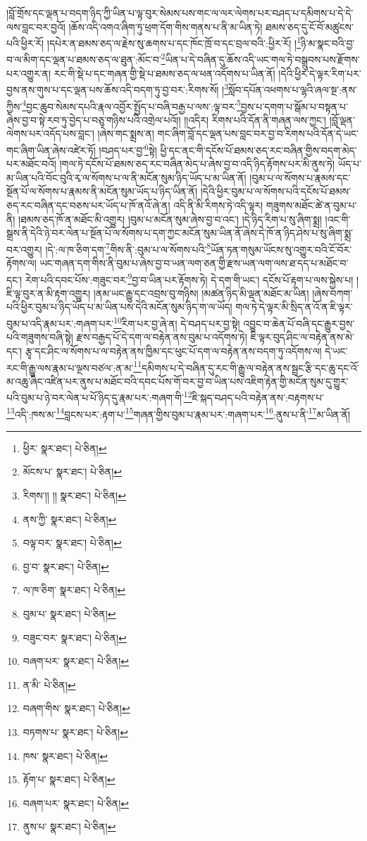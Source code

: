 །བློ་གྲོས་དང་ལྡན་པ་བདག་ཉིད་ཀྱི་ཡིན་པ་ལྟ་བུར་སེམས་པས་གང་ལ་ལར་ལེགས་པར་བཤད་པ་དམིགས་པ་དེ་དེ་ལས་བླང་བར་བྱའོ། །ཆོས་འདི་འགའ་ཞིག་ཏུ་ཕྲག་དོག་གིས་གནས་པ་ནི་མ་ཡིན་ཏེ། ཐམས་ཅད་དུ་ངོ་བོ་མཚུངས་པའི་ཕྱིར་རོ། །དཔེར་ན་ཐམས་ཅད་ལ་རྗེས་སུ་ཆགས་པ་དང་ཁོང་ཁྲོ་བ་དང་བྲལ་བའི་:ཕྱིར་རོ། །\footnote{ཕྱིར་  སྣར་ཐང་།  པེ་ཅིན། }ཉི་མ་སྣང་བའི་བྱ་བ་ལ་མིག་དང་ལྡན་པ་ཐམས་ཅད་ལ་ཐུན་:མོང་བ་\footnote{མོངས་པ་  སྣར་ཐང་།  པེ་ཅིན། }ཡིན་པ་དེ་བཞིན་དུ་ཆོས་འདི་ཡང་གལ་ཏེ་བསྒྲུབས་པས་རྫོགས་པར་འགྱུར་ན། རང་གི་སྡེ་པ་དང་གཞན་གྱི་སྡེ་པ་ཐམས་ཅད་ལ་ཕན་འདོགས་པ་ཡིན་ནོ། །དེའི་ཕྱིར་དེ་ལྟར་རིག་པར་བྱས་ནས་གུས་པ་དང་ལྡན་པས་ཆོས་འདི་བདག་ཏུ་བྱ་བར་:རིགས་སོ། །\footnote{རིགས་།། །།  སྣར་ཐང་།  པེ་ཅིན། }སློབ་དཔོན་འཕགས་པ་ལྷའི་ཞལ་སྔ་:ནས་ཀྱིས་\footnote{ནས་ཀྱི་  སྣར་ཐང་།  པེ་ཅིན། }བྱང་ཆུབ་སེམས་དཔའི་རྣལ་འབྱོར་སྤྱོད་པ་བཞི་བརྒྱ་པ་ལས་:ལྟ་བར་\footnote{བལྟ་བར་  སྣར་ཐང་།  པེ་ཅིན། }བྱས་པ་དགག་པ་སྒོམ་པ་བསྟན་པ་ཞེས་བྱ་བ་སྟེ་རབ་ཏུ་བྱེད་པ་བཅུ་གཉིས་པའི་འགྲེལ་པའོ།། །།འདིར། རིགས་པའི་དོན་ནི་གཞན་ལས་ཀྱང་། །བློ་ལྡན་ལེགས་པར་འདོད་པས་བླང་། །ཞེས་གང་སྨྲས་ན། གང་ཞིག་བློ་དང་ལྡན་པས་བླང་བར་བྱ་བ་རིགས་པའི་དོན་དེ་ཡང་གང་ཞིག་ཡིན་ཞེས་འཛེར་ཏོ། །བཤད་པར་བྱ་\footnote{བྱ་བ་  སྣར་ཐང་།  པེ་ཅིན། }སྟེ། ཕྱི་དང་ནང་གི་དངོས་པོ་ཐམས་ཅད་རང་བཞིན་གྱིས་བདག་མེད་པར་མཐོང་བའོ། །གལ་ཏེ་དངོས་པོ་ཐམས་ཅད་རང་བཞིན་མེད་པ་ཞེས་བྱ་བ་འདི་ཉིད་རྟོགས་པར་མི་ནུས་ཏེ། ཡོད་པ་མ་ཡིན་པའི་བོང་བུའི་རྭ་ལ་སོགས་པ་ལ་ནི་མངོན་སུམ་ཉིད་ཡོད་པ་མ་ཡིན་ནོ། །བུམ་པ་ལ་སོགས་པ་རྣམས་དང་སྔོན་པོ་ལ་སོགས་པ་རྣམས་ནི་མངོན་སུམ་ཡོད་པ་ཉིད་ཡིན་ནོ། །དེའི་ཕྱིར་བུམ་པ་ལ་སོགས་པའི་དངོས་པོ་ཐམས་ཅད་རང་བཞིན་དང་བཅས་པར་ཡོད་པ་ཁོ་ནའོ་ཞེ་ན། འདི་ནི་མི་རིགས་ཏེ་འདི་ལྟར། གཟུགས་མཐོང་ཚེ་ན་བུམ་པ་ནི། །ཐམས་ཅད་ཁོ་ན་མཐོང་མི་འགྱུར། །བུམ་པ་མངོན་སུམ་ཞེས་བྱ་བ་འང་། །དེ་ཉིད་རིག་པ་སུ་ཞིག་སྨྲ། །འང་གི་སྒྲས་ནི་དེའི་ཉེ་བར་ལེན་པ་སྔོན་པོ་ལ་སོགས་པ་དག་ཀྱང་མངོན་སུམ་ཡིན་ནོ་ཞེས་དེ་ཁོ་ན་ཉིད་ཤེས་པ་སུ་ཞིག་སྨྲ་བར་འགྱུར། །དེ་:ལ་ཁ་ཅིག་དག་\footnote{ལ་ཁ་ཅིག་  སྣར་ཐང་།  པེ་ཅིན། }གིས་ནི་:བུམ་པ་ལ་སོགས་པའི་\footnote{བུམ་པ་  སྣར་ཐང་།  པེ་ཅིན། }ཡོན་ཏན་གསུམ་ཡོངས་སུ་འགྱུར་བའི་ངོ་བོར་རྟོགས་ལ། ཡང་གཞན་དག་གིས་ནི་བུམ་པ་ཞེས་བྱ་བ་ཡན་ལག་ཅན་གྱི་རྫས་ཡན་ལག་ལས་ཐ་དད་པ་མཐོང་བ་དང་། རེག་པའི་དབང་པོས་:གཟུང་བར་\footnote{བཟུང་བར་  སྣར་ཐང་།  པེ་ཅིན། }བྱ་བ་ཡིན་པར་རྟོགས་ཏེ། དེ་དག་གི་ཡང་། དངོས་པོ་རྟག་པ་ལས་སྐྱེས་པ། །ཇི་ལྟ་བུར་ན་མི་རྟག་འགྱུར། །ནམ་ཡང་རྒྱུ་དང་འབྲས་བུ་གཉིས། །མཚན་ཉིད་མི་ལྡན་མཐོང་མ་ཡིན། །ཞེས་བཀག་པའི་ཕྱིར་བུམ་པ་ཉིད་ཡོད་པ་མ་ཡིན་པས་དེའི་མངོན་སུམ་ཉིད་ག་ལ་ཡོད། གལ་ཏེ་དེ་ལྟར་མི་སྲིད་ན་འོ་ན་ཇི་ལྟར་བུམ་པ་འདི་རྣམ་པར་:གཞག་པར་\footnote{བཞག་པར་  སྣར་ཐང་།  པེ་ཅིན། }རིག་པར་བྱ་ཞེ་ན། དེ་བཤད་པར་བྱ་སྟེ། འབྱུང་བ་ཆེན་པོ་བཞི་དང་རྒྱུར་བྱས་པའི་གཟུགས་བཞི་སྟེ། རྫས་བརྒྱད་པོ་དེ་དག་ལ་བརྟེན་ནས་བུམ་པ་འདོགས་ཏེ། ཇི་ལྟར་བུད་ཤིང་ལ་བརྟེན་ནས་མེ་དང་། རྩྭ་དང་ཤིང་ལ་སོགས་པ་ལ་བརྟེན་ནས་ཁྱིམ་དང་ཕུང་པོ་དག་ལ་བརྟེན་ནས་བདག་ཏུ་འདོགས་ལ། དེ་ཡང་རང་གི་རྒྱུ་ལས་རྣམ་པ་ལྔས་བཙལ་:ན་མ་\footnote{ན་མི་  པེ་ཅིན། }དམིགས་པ་དེ་བཞིན་དུ་རང་གི་རྒྱུ་ལ་བརྟེན་ནས་སྦྲང་རྩི་དང་ཆུ་དང་འོ་མ་འཆུ་ཞིང་འཛིན་པར་ནུས་པ་མཐོང་བའི་དབང་པོས་གོ་བར་བྱ་བ་ཡིན་པས་འཇིག་རྟེན་གྱི་མངོན་སུམ་དུ་གྱུར་པའི་བུམ་པ་ཉེ་བར་ལེན་པ་པོ་ཉིད་དུ་རྣམ་པར་:གཞག་གི་\footnote{བཞག་གིས་  སྣར་ཐང་།  པེ་ཅིན། }ཇི་སྐད་བཤད་པའི་བརྟེན་ནས་:བརྟགས་པ་\footnote{བཏགས་པ་  སྣར་ཐང་།  པེ་ཅིན། }འདི་:ཁས་མ་\footnote{ཁས་  སྣར་ཐང་།  པེ་ཅིན། }བླངས་པར་:རྟག་པ་\footnote{རྟོག་པ་  སྣར་ཐང་།  པེ་ཅིན། }གཞན་གྱིས་བུམ་པ་རྣམ་པར་:གཞག་པར་\footnote{བཞག་པར་  སྣར་ཐང་།  པེ་ཅིན། }:ནུས་པ་ནི་\footnote{ནུས་པ་  སྣར་ཐང་།  པེ་ཅིན། }མ་ཡིན་ནོ། 
